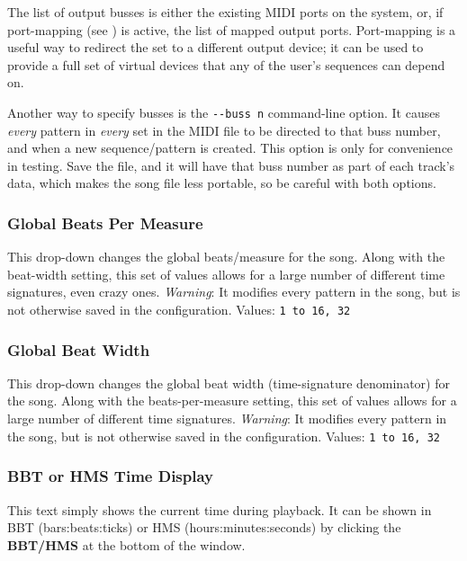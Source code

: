    The list of
   output busses is either the existing MIDI ports on the system, or,
   if port-mapping (see ) is active, the list
   of mapped output ports.
   Port-mapping is a useful way to redirect the set to a different output
   device; it can be used to provide a full set of virtual devices that any of
   the user's sequences can depend on.

   Another way to specify busses is the
   \texttt{-{}-buss n} command-line option.
   It causes \textsl{every} pattern in \textsl{every} set in the MIDI
   file to be directed to that buss number, and when a new
   sequence/pattern is created.  This option is only
   for convenience in testing.  Save the file, and it will
   have that buss number as part of each track's data, which makes the song
   file less portable, so be careful with both options.

\subsubsection{Global Beats Per Measure}
\label{subsubsec:introduction_global_beats_per_measure}

   This drop-down changes the global beats/measure for the song.
   Along with the beat-width setting, this set of values allows
   for a large number of different time signatures, even crazy ones.
   \textsl{Warning}: It modifies every pattern in the song, but is not
   otherwise saved in the configuration.
   Values: \texttt{1 to 16, 32}

\subsubsection{Global Beat Width}
\label{subsubsec:introduction_global_beat_width}

   This drop-down changes the global beat width (time-signature denominator)
   for the song.
   Along with the beats-per-measure setting, this set of values allows
   for a large number of different time signatures.
   \textsl{Warning}: It modifies every pattern in the song, but is not
   otherwise saved in the configuration.
   Values: \texttt{1 to 16, 32}

\subsubsection{BBT or HMS Time Display}
\label{subsubsec:introduction_time_display}

   This text simply shows the current time during playback. 
   It can be shown in BBT (bars:beats:ticks) or HMS (hours:minutes:seconds)
   by clicking the \textbf{BBT/HMS} at the bottom of the window.

